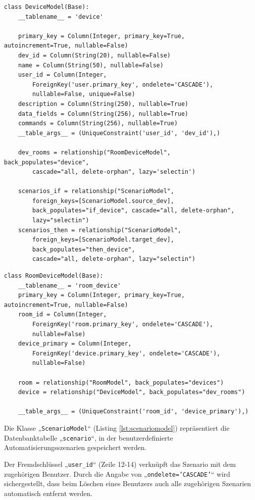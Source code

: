 \documentclass[12pt, letterpaper]{article}
\begin{document}
  \begin{lstlisting}[style=mypython, label={lst:devicemodel}, caption={models.py: DeviceModel}]
  class DeviceModel(Base):
    __tablename__ = 'device'

    primary_key = Column(Integer, primary_key=True, autoincrement=True, nullable=False)
    dev_id = Column(String(20), nullable=False)
    name = Column(String(50), nullable=False)
    user_id = Column(Integer,  
        ForeignKey('user.primary_key', ondelete='CASCADE'), 
        nullable=False, unique=False)
    description = Column(String(250), nullable=True)
    data_fields = Column(String(256), nullable=True)
    commands = Column(String(256), nullable=True)
    __table_args__ = (UniqueConstraint('user_id', 'dev_id'),)

    dev_rooms = relationship("RoomDeviceModel", back_populates="device", 
        cascade="all, delete-orphan", lazy='selectin')

    scenarios_if = relationship("ScenarioModel", 
        foreign_keys=[ScenarioModel.source_dev], 
        back_populates="if_device", cascade="all, delete-orphan", 
        lazy="selectin")
    scenarios_then = relationship("ScenarioModel", 
        foreign_keys=[ScenarioModel.target_dev], 
        back_populates="then_device", 
        cascade="all, delete-orphan", lazy="selectin")
  \end{lstlisting}
  \begin{lstlisting}[style=mypython, label={lst:roomdevmodel}, caption={models.py: RoomDeviceModel}]
  class RoomDeviceModel(Base):
    __tablename__ = 'room_device'
    primary_key = Column(Integer, primary_key=True, autoincrement=True, nullable=False)
    room_id = Column(Integer, 
        ForeignKey('room.primary_key', ondelete='CASCADE'), 
        nullable=False)
    device_primary = Column(Integer, 
        ForeignKey('device.primary_key', ondelete='CASCADE'), 
        nullable=False)

    room = relationship("RoomModel", back_populates="devices")
    device = relationship("DeviceModel", back_populates="dev_rooms")

    __table_args__ = (UniqueConstraint('room_id', 'device_primary'),)
  \end{lstlisting}
  \par Die Klasse „\texttt{ScenarioModel}“ (Listing \ref{lst:scenariomodel}) repräsentiert die Datenbanktabelle „\texttt{scenario}“, in der benutzerdefinierte Automatisierungsszenarien gespeichert werden.
  \par Der Fremdschlüssel „\texttt{user\_id}“ (Zeile 12-14) verknüpft das Szenario mit dem zugehörigen Benutzer. Durch die Angabe von „\texttt{ondelete='CASCADE'}“ wird sichergestellt, dass beim Löschen eines Benutzers auch alle zugehörigen Szenarien automatisch entfernt werden.
\end{document}
